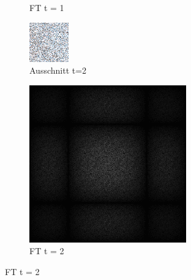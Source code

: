 \begin{figure}[H]
\begin{subfigure}[b]{0.2\linewidth}
      \caption{FT t = 1}
      \label{pic:sortier_t1}
    \end{subfigure}
    \begin{subfigure}[b]{0.2\linewidth}
      \includegraphics[width=\linewidth]{content/TemporalerAlg/Bilder/Retargeting/Bedeutung Retargeting/Sorting_Small_Block/Ausschnitt/Ausschnitt3.png}
      \caption{Ausschnitt t=2}
      \label{pic:sortier_screen_t2}
    \end{subfigure}
    \begin{subfigure}[b]{0.2\linewidth}
        \includegraphics[width=\linewidth]{content/TemporalerAlg/Bilder/Retargeting/Bedeutung Retargeting/Sorting_Small_Block/Spektrum/Ausschnitt3.png}
        \caption{FT t = 2}
        \label{pic:sortier_t2}
      \end{subfigure}
    

\end{figure}
